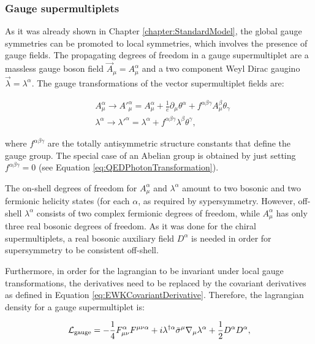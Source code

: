 \subsubsection{Gauge supermultiplets}

As it was already shown in Chapter \ref{chapter:StandardModel}, the global gauge symmetries can be promoted to local symmetries, which involves the presence of gauge fields.
The propagating degrees of freedom in a gauge supermultiplet are a massless gauge boson field $\vec{A}_\mu = A^\alpha_\mu$ and a two component Weyl Dirac gaugino $\vec{\lambda} = \lambda^\alpha$.
The gauge transformations of the vector supermultiplet fields are:

\begin{equation}
\begin{split}
&A^\alpha_\mu \rightarrow A'^\alpha_\mu = A^\alpha_\mu + \frac{1}{e}\partial_\mu \theta^\alpha + f^{\alpha \beta \gamma} A^\beta_\mu \theta_\gamma \\
&\lambda^\alpha \rightarrow \lambda'^\alpha = \lambda^\alpha + f^{\alpha \beta \gamma} \lambda^\beta \theta^\gamma,
\end{split}
\label{eq:SUSYGaugeTransformationFields}
\end{equation}

\noindent where $f^{\alpha \beta \gamma}$ are the totally antisymmetric structure constants that define the gauge group.
The special case of an Abelian group is obtained by just setting $f^{\alpha \beta \gamma} = 0$ (see Equation \ref{eq:QEDPhotonTransformation}).

The on-shell degrees of freedom for $A^\alpha_\mu$ and $\lambda^\alpha$ amount to two bosonic and two fermionic helicity states (for each $\alpha$, as required by sypersymmetry.
However, off-shell $\lambda^\alpha$ consists of two complex fermionic degrees of freedom, while $A^\alpha_\mu$ has only three real bosonic degrees of freedom.
As it was done for the chiral supermultiplets, a real bosonic auxiliary field $D^\alpha$ is needed in order for supersymmetry to be consistent off-shell.

Furthermore, in order for the lagrangian to be invariant under local gauge transformations, the derivatives need to be replaced by the covariant derivatives as defined in Equation \ref{eq:EWKCovariantDerivative}.
Therefore, the lagrangian density for a gauge supermultiplet is:

\begin{equation}
\mathcal{L}_{\text{gauge}} = -\frac{1}{4}F^{\alpha}_{\mu\nu} F^{\mu\nu\alpha} + i\lambda^{\dagger\alpha}\bar{\sigma}^\mu \nabla_\mu\lambda^\alpha + \frac{1}{2}D^\alpha D^\alpha,
\label{eq:SUSYGaugeLagrangian}
\end{equation}

